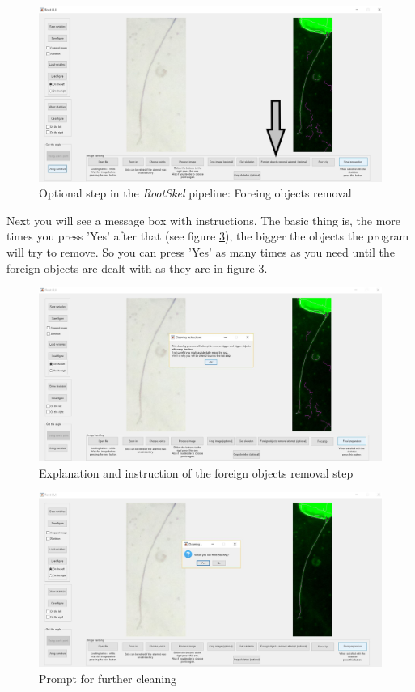 \begin{figure}[H]
	\centering
	\includegraphics[width=\textwidth]{../Figures/manual/optionalA1.jpg}
	\caption{Optional step in the \textit{RootSkel} pipeline: Foreing objects removal}
	\label{fig:img30}
\end{figure}

Next you will see a message box with instructions. The basic thing is, the more times you press 'Yes' after that (see figure \ref{fig:img32}), the bigger the objects the program will try to remove.
So you can press 'Yes' as many times as you need until the foreign objects are dealt with as they are in figure \ref{fig:img32}.

\begin{figure}[H]
	\centering
	\includegraphics[width=\textwidth]{../Figures/manual/optionalA2.jpg}
	\caption{Explanation and instruction of the foreign objects removal step}
	\label{fig:img31}
\end{figure}

\begin{figure}[H]
	\centering
	\includegraphics[width=\textwidth]{../Figures/manual/optionalA3.jpg}
	\caption{Prompt for further cleaning}
	\label{fig:img32}
\end{figure}

